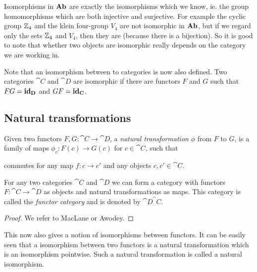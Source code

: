 Isomorphisms in $\mathbf{Ab}$ are exactly the isomorphisms which we know, ie. the group homomorphisms which are both injective and surjective.
For example the cyclic group $\mathbb{Z}_4$ and the klein four-group $V_4$ are not isomorphic in $\mathbf{Ab}$, but if we regard only the sets $\mathbb{Z}_4$ and $V_4$, then they are (because there is a bijection). So it is good to note that whether two objects are isomorphic  really depends on the category we are working in.

Note that an isomorphism between to categories is now also defined. Two categories $\cat{C}$ and $\cat{D}$ are isomorphic if there are functors $F$ and $G$ such that $ FG = \mathbf{id}_{\mathbf{D}}$ and $GF = \mathbf{id}_{\mathbf{C}}$.

\subsection{Natural transformations}

\begin{definition}
	Given two functors $F, G: \cat{C} \to \cat{D}$, a \emph{natural transformation} $\phi$ from $F$ to $G$, is a family of maps $\phi_c : F(c) \to G(c)$ for $c \in \cat{C}$, such that
	\begin{center}
	\end{center}
	commutes for any map $f: c \to c'$ and any objects $c, c' \in \cat{C}$.
\end{definition}

\begin{lemma}
	For any two categories $\cat{C}$ and $\cat{D}$ we can form a category with functors $F: \cat{C} \to \cat{D}$ as objects and natural transformations as maps. This category is called the \emph{functor category} and is denoted by $\cat{D}^\cat{C}$.
\end{lemma}
\begin{proof}
	We refer to MacLane or Awodey.
\end{proof}

This now also gives a notion of isomorphisms between functors. It can be easily seen that a isomorphism between two functors is a natural transformation which is an isomorphism pointwise. Such a natural transformation is called a natural isomorphism.


